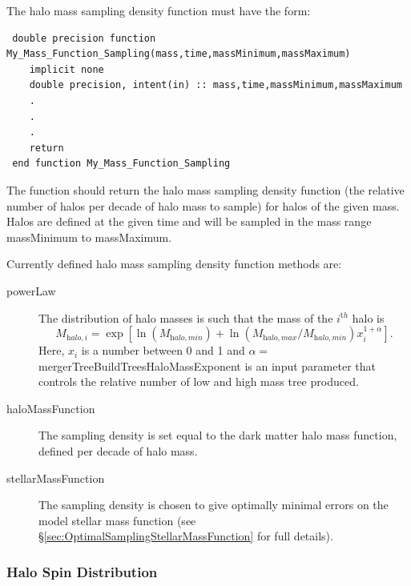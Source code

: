 The halo mass sampling density function must have the form:
\begin{verbatim}
 double precision function My_Mass_Function_Sampling(mass,time,massMinimum,massMaximum)
    implicit none
    double precision, intent(in) :: mass,time,massMinimum,massMaximum
    .
    .
    .
    return
 end function My_Mass_Function_Sampling
\end{verbatim}
The function should return the halo mass sampling density function (the relative number of halos per decade of halo mass to sample) for halos of the given {\normalfont \ttfamily mass}. Halos are defined at the given {\normalfont \ttfamily time} and will be sampled in the mass range {\normalfont \ttfamily massMinimum} to {\normalfont \ttfamily massMaximum}.

Currently defined halo mass sampling density function methods are:
\begin{description}
 \item [{\normalfont \ttfamily powerLaw}] The distribution of halo masses is such that the mass of the $i^{\mathrm th}$ halo is
\begin{equation}
 M_{\mathrm halo,i} = \exp\left[ \ln(M_{\mathrm halo,min}) + \ln\left({M_{\mathrm halo,max}/M_{\mathrm halo,min}}\right) x_i^{1+\alpha} \right].
\end{equation}
Here, $x_i$ is a number between 0 and 1 and $\alpha=${\normalfont \ttfamily mergerTreeBuildTreesHaloMassExponent} is an input parameter that controls the relative number of low and high mass tree produced. 
\item [{\normalfont \ttfamily haloMassFunction}] The sampling density is set equal to the dark matter halo mass function, defined per decade of halo mass.
\item [{\normalfont \ttfamily stellarMassFunction}] The sampling density is chosen to give optimally minimal errors on the model stellar mass function (see \S\ref{sec:OptimalSamplingStellarMassFunction} for full details).
\end{description}

\subsubsection{Halo Spin Distribution}

